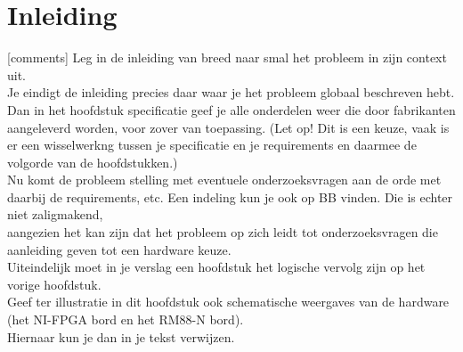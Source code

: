 	\chapter{Inleiding}
	[comments]
	Leg in de inleiding van breed naar smal het probleem in zijn context uit.\\
	Je eindigt de inleiding precies daar waar je het probleem globaal beschreven hebt.\\
	Dan in het hoofdstuk specificatie geef je alle onderdelen weer die door fabrikanten aangeleverd worden, voor zover van toepassing. (Let op! Dit is een keuze, vaak is er een wisselwerkng tussen je specificatie en je requirements en daarmee de volgorde van de hoofdstukken.)\\
	Nu komt de probleem stelling met eventuele onderzoeksvragen aan de orde met daarbij de requirements, etc. Een indeling kun je ook op BB vinden. Die is echter niet zaligmakend,\\ aangezien het kan zijn dat het probleem op zich leidt tot onderzoeksvragen die aanleiding geven tot een hardware keuze.\\
	
	Uiteindelijk moet in je verslag een hoofdstuk het logische vervolg zijn op het vorige hoofdstuk.\\
	

	Geef ter illustratie in dit hoofdstuk ook schematische weergaves van de hardware (het NI-FPGA bord en het RM88-N bord).\\
	Hiernaar kun je dan in je tekst verwijzen.
	
	
	
	